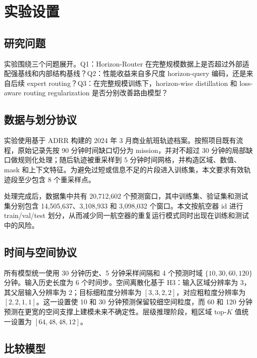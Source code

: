 \section{实验设置}

\subsection{研究问题}

实验围绕三个问题展开。Q1：Horizon-Router 在完整规模数据上是否超过外部适配强基线和内部结构基线？Q2：性能收益来自多尺度 horizon-query 编码，还是来自后续 expert routing？Q3：在完整规模训练下，horizon-wise distillation 和 loss-aware routing regularization 是否分别改善路由模型？

\subsection{数据与划分协议}

实验使用基于 ADRR 构建的 2024 年 3 月商业航班轨迹档案。按照项目既有流程，原始记录先按 90 分钟时间缺口切分为 mission，并对不超过 30 分钟的局部缺口做规则化处理；随后轨迹被重采样到 5 分钟时间网格，并构造区域、数值、mask 和上下文特征。为避免过短或信息不足的片段进入训练集，本文要求有效轨迹段至少包含 8 个重采样点。

处理完成后，数据集中共有 20,712,602 个预测窗口，其中训练集、验证集和测试集分别包含 14,505,637、3,108,933 和 3,098,032 个窗口。本文按航空器 id 进行 train/val/test 划分，从而减少同一航空器的重复运行模式同时出现在训练和测试中的风险。

\subsection{时间与空间协议}

所有模型统一使用 30 分钟历史、5 分钟采样间隔和 4 个预测时域 $\{10,30,60,120\}$ 分钟。输入历史长度为 6 个时间步。空间离散化基于 H3：输入区域分辨率为 3，其父层输入分辨率为 2；目标细粒度分辨率为 $[3,3,2,2]$，对应粗粒度分辨率为 $[2,2,1,1]$。这一设置使 10 和 30 分钟预测保留较细空间粒度，而 60 和 120 分钟预测在更宽的空间支撑上建模未来不确定性。层级推理阶段，粗区域 top-$K$ 值统一设置为 $[64,48,48,12]$。

\subsection{比较模型}

